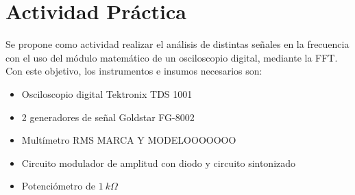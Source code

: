   \pagebreak
  \section{Actividad Práctica}
    Se propone como actividad realizar el análisis de distintas señales en la frecuencia con el uso del
    módulo matemático de un osciloscopio digital, mediante la FFT. Con este objetivo, los instrumentos
    e insumos necesarios son:

    \begin{itemize}
      \item Osciloscopio digital Tektronix TDS 1001
      \item 2 generadores de señal Goldstar FG-8002
      \item Multímetro RMS MARCA Y MODELOOOOOOO
      \item Circuito modulador de amplitud con diodo y circuito sintonizado
      \item Potenciómetro de $1~k\Omega$
    \end{itemize}

    
    
    
    
    
    
    
